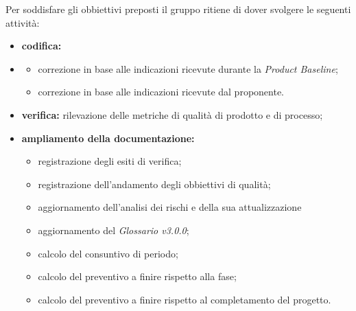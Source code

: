Per soddisfare gli obbiettivi preposti il gruppo ritiene di dover svolgere le seguenti attività:
\begin{itemize}
    \item\textbf{codifica:}
    \item \begin{itemize}
              \item correzione in base alle indicazioni ricevute durante la \textit{Product Baseline};
              \item correzione in base alle indicazioni ricevute dal proponente.
          \end{itemize}
    \item \textbf{verifica:} rilevazione delle metriche di qualità di prodotto e di processo;
    \item \textbf{ampliamento della documentazione:}
          \begin{itemize}
              \item registrazione degli esiti di verifica;
              \item registrazione dell'andamento degli obbiettivi di qualità;
              \item aggiornamento dell'analisi dei rischi e della sua attualizzazione
              \item aggiornamento del \textit{Glossario v3.0.0};
              \item calcolo del consuntivo di periodo;
              \item calcolo del preventivo a finire rispetto alla fase;
              \item calcolo del preventivo a finire rispetto al completamento del progetto.
          \end{itemize}
\end{itemize}



